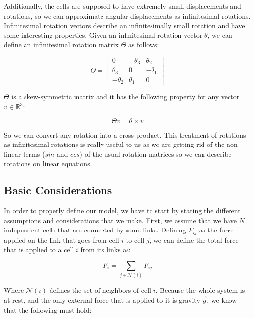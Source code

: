 Additionally, the cells are supposed to have extremely small displacements 
and rotations, so we can approximate angular displacements as 
infinitesimal rotations. Infinitesimal rotation vectors describe 
an infinitesimally small rotation and have some interesting properties.
Given an infinitesimal rotation vector $\theta$, we can define an infinitesimal
rotation matrix $\Theta$ as follows:

\begin{equation}
    \Theta = \begin{bmatrix}
        0 & -\theta_3 & \theta_2 \\
        \theta_3 & 0 & -\theta_1 \\
        -\theta_2 & \theta_1 & 0
    \end{bmatrix}
\end{equation}

$\Theta$ is a skew-symmetric matrix and it has the following property for 
any vector $v \in \mathbb{R}^3$:

\begin{equation}
    \Theta v = \theta \times v
\end{equation}


So we can convert any rotation into a cross product. This treatment of 
rotations as infinitesimal rotations is really useful to us as   
we are getting rid of the non-linear terms ($sin$ and $cos$) of the usual
rotation matrices so we can describe rotations on linear equations.
\subsection{Basic Considerations}

In order to properly define our model, we have to start by stating the different 
assumptions and considerations that we make. First, we assume that we have 
$N$ independent cells that are connected by some links. Defining $F_{ij}$
as the force applied on the link that goes from cell $i$ to cell $j$, we 
can define the total force that is applied to a cell $i$ from its links as:

\begin{equation}
    F_i = \sum_{j \in \mathcal{N}(i)} F_{ij}
\end{equation}

Where $\mathcal{N}(i)$ defines the set of neighbors of cell $i$. Because the 
whole system is at rest, and the only external force that is applied to it 
is gravity $\vec{g}$, we know that the following must hold:

